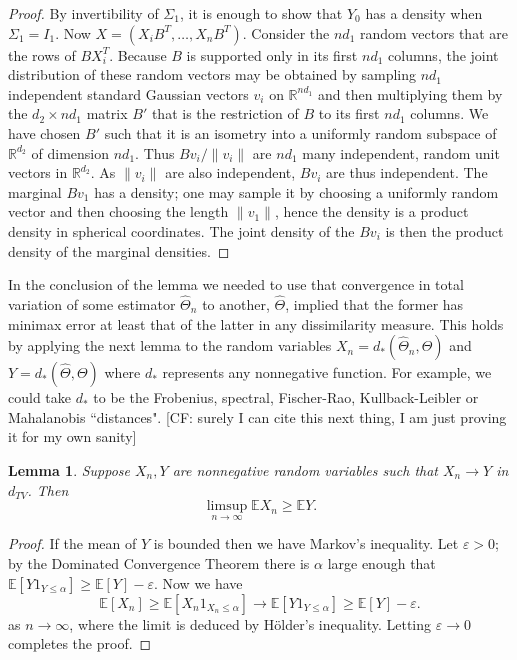 \documentclass[aos]{imsart}
\newtheorem{lemma}[theorem]{Lemma}
\theoremstyle{definition}
\numberwithin{equation}{section}
\newcommand{\R}{{\mathbb{R}}}
\newcommand{\E}{\mathbb{E}}
\newcommand{\eps}{\varepsilon}
\newcommand{\CF}[1]{{\color{purple}[CF: #1]}}
\begin{document}
\begin{proof}
By invertibility of $\Sigma_1$, it is enough to show that $Y_0$ has a density when $\Sigma_1 = I_1$. Now $X = (X_i B^T, \dots, X_n B^T)$. Consider the $nd_1$ random vectors that are the rows of $BX_i^T$. Because $B$ is supported only in its first $nd_1$ columns, the joint distribution of these random vectors may be obtained by sampling $n d_1$ independent standard Gaussian vectors $v_i$ on $\R^{nd_1}$ and then multiplying them by the $d_2 \times nd_1$ matrix $B'$ that is the restriction of $B$ to its first $nd_1$ columns. We have chosen $B'$ such that it is an isometry into a uniformly random subspace of $\R^{d_2}$ of dimension $nd_1$. Thus $Bv_i/\|v_i\|$ are $nd_1$ many independent, random unit vectors in $\R^{d_2}$. As $\|v_i\|$ are also independent, $B v_i$ are thus independent. The marginal $Bv_1$ has a density; one may sample it by choosing a uniformly random vector and then choosing the length $\|v_1\|$, hence the density is a product density in spherical coordinates. The joint density of the $Bv_i$ is then the product density of the marginal densities. \end{proof}

In the conclusion of the lemma we needed to use that convergence in total variation of some estimator $\widehat{\Theta}_n$ to another, $\widehat{\Theta}$, implied that the former has minimax error at least that of the latter in any dissimilarity measure. This holds by applying the next lemma to the random variables $X_n = d_*( \widehat{\Theta}_n, \Theta)$ and $Y = d_*(\widehat{\Theta}, \Theta)$ where $d_*$ represents any nonnegative function. For example, we could take $d_*$ to be the Frobenius, spectral, Fischer-Rao, Kullback-Leibler or Mahalanobis ``distances".
\CF{surely I can cite this next thing, I am just proving it for my own sanity}
\begin{lemma}\label{lem:dtv}
Suppose $X_n, Y$ are nonnegative random variables such that $X_n \to Y$ in $d_{TV}$. Then $$\limsup_{n\to \infty} \E X_n \geq \E Y.$$
\end{lemma}
\begin{proof}

If the mean of $Y$ is bounded then we have Markov's inequality. Let $\eps > 0$; by the Dominated Convergence Theorem there is $\alpha$ large enough that $\E[Y 1_{Y \leq \alpha}] \geq \E[Y] - \eps$. Now we have
 $$\E[X_n] \geq \E[X_n 1_{X_n \leq \alpha} ] \to \E[ Y 1_{Y \leq \alpha}] \geq \E[Y] - \eps.%
 $$
 as $n \to \infty$, where the limit is deduced by H\"older's inequality. Letting $\eps \to 0$ completes the proof.\end{proof}
\end{document}
